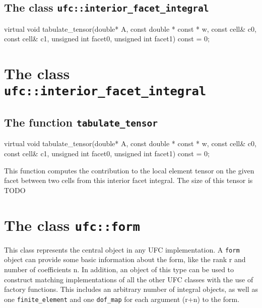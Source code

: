 \subsection{The class \texttt{ufc::interior\_facet\_integral}}

\begin{code}
virtual void tabulate_tensor(double* A,
                             const double * const * w,
                             const cell& c0,
                             const cell& c1,
                             unsigned int facet0,
                             unsigned int facet1) const = 0;
\end{code}

\section{The class \texttt{ufc::interior\_facet\_integral}}

\subsection{The function \texttt{tabulate\_tensor}}

\begin{code}
virtual void tabulate_tensor(double* A,
                             const double * const * w,
                             const cell& c0,
                             const cell& c1,
                             unsigned int facet0,
                             unsigned int facet1) const = 0;
\end{code}

This function computes the contribution to the local element tensor
on the given facet between two cells from this interior facet integral.
The size of this tensor is TODO

\section{The class \texttt{ufc::form}}

This class represents the central object in any UFC implementation.
A \texttt{form} object can provide some basic information about the form,
like the rank r and number of coefficients n.
In addition, an object of this type can be used to construct matching
implementations of all the other UFC classes with the use of factory functions.
This includes an arbitrary number of integral objects,
as well as one \texttt{finite\_element} and one \texttt{dof\_map} for
each argument (r+n) to the form.

